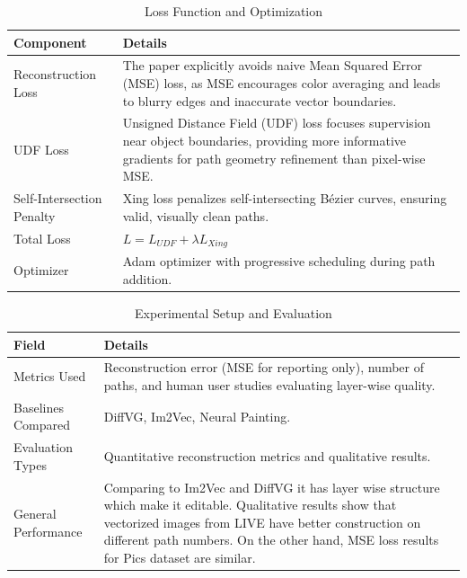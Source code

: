 \begin{table}[h!]
\centering
\caption{Loss Function and Optimization}
\begin{tabular}{|l|p{10cm}|}
\hline
\textbf{Component} & \textbf{Details} \\ \hline

Reconstruction Loss &
The paper explicitly avoids naive Mean Squared Error (MSE) loss, as MSE encourages color averaging and leads to blurry edges and inaccurate vector boundaries. \\ \hline

UDF Loss &
Unsigned Distance Field (UDF) loss focuses supervision near object boundaries, providing more informative gradients for path geometry refinement than pixel-wise MSE. \\ \hline

Self-Intersection Penalty &
Xing loss penalizes self-intersecting Bézier curves, ensuring valid, visually clean paths. \\ \hline

Total Loss &
$L = L_{UDF} + \lambda L_{Xing}$ \\ \hline

Optimizer &
Adam optimizer with progressive scheduling during path addition. \\ \hline

\end{tabular}
\end{table}

\begin{table}[h!]
\centering
\caption{Experimental Setup and Evaluation}
\begin{tabular}{|l|p{10cm}|}
\hline
\textbf{Field} & \textbf{Details} \\ \hline

Metrics Used &
Reconstruction error (MSE for reporting only), number of paths, and human user studies evaluating layer-wise quality. \\ \hline

Baselines Compared &
DiffVG, Im2Vec, Neural Painting. \\ \hline

Evaluation Types &
Quantitative reconstruction metrics and qualitative results. \\ \hline

General Performance &
Comparing to Im2Vec and DiffVG it has layer wise structure which make it editable. Qualitative results show that vectorized images from LIVE have better construction on different path numbers. On the other hand, MSE loss results for Pics dataset are similar. \\ \hline

\end{tabular}
\end{table}

